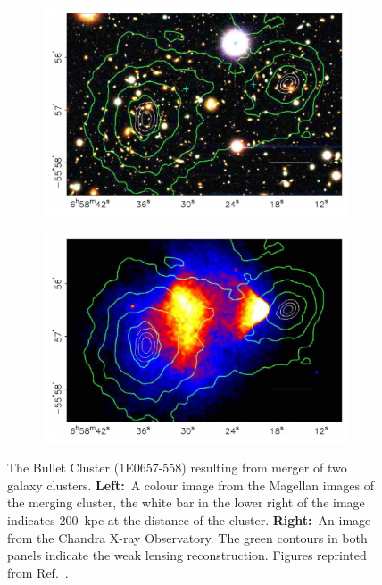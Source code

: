 \begin{figure}[h!]
     \centering
     \begin{subfigure}{0.49\textwidth}
         \centering
         \includegraphics[width=\textwidth]{figures/DMOverview/f1a.new.jpeg2ps.png}
         \caption{}
         \label{fig:DMOverview/BCGravLensMap}
     \end{subfigure}
     \hfill
     \begin{subfigure}{0.49\textwidth}
         \centering
         \includegraphics[width=\textwidth]{figures/DMOverview/f1b.new.jpeg2ps.png}
         \caption{}
         \label{fig:DMOverview/BCXrayData}
     \end{subfigure}
     \caption[The Bullet Cluster (1E0657-558) resulting from merger of two galaxy clusters.]{The Bullet Cluster (1E0657-558) resulting from merger of two galaxy clusters. \textbf{Left:}~A colour image from the Magellan images of the merging cluster, the white bar in the lower right of the image indicates 200~kpc at the distance of the cluster. \textbf{Right:}~An image from the Chandra X-ray Observatory. The green contours in both panels indicate the weak lensing reconstruction. Figures reprinted from Ref.~\cite{Clowe2006}.}
     \label{fig:DMOverview/BulletCluster}
\end{figure}


